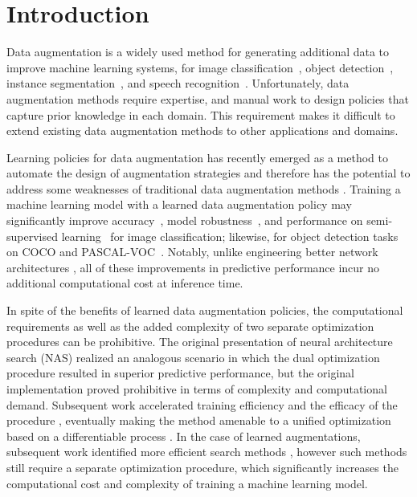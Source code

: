 

\section{Introduction}


Data augmentation is a widely used method for generating additional data to improve machine learning systems, for image classification~\cite{simard2003best,krizhevsky2012imagenet,devries2017dataset,zhang2017mixup}, object detection~\cite{girshick2018detectron}, instance segmentation~\cite{fang2019instaboost}, and speech recognition~\cite{kanda2013elastic, hannun2014deep, park2019specaugment}. Unfortunately, data augmentation methods require expertise, and manual work to design policies that capture prior knowledge in each domain. This requirement makes it difficult to extend existing data augmentation methods to other applications and domains.  

Learning policies for data augmentation 
has recently emerged as a method to automate the design of augmentation strategies and therefore has the potential to address some weaknesses of traditional data augmentation methods
\cite{cubuk2018autoaugment, zoph2019learning, ho2019population, lim2019fast}. Training a machine learning model with a learned data augmentation policy
may significantly improve accuracy~\cite{cubuk2018autoaugment}, model robustness~\cite{lopes2019improving, yin2019afourier, recht2018cifar}, and performance on semi-supervised learning~\cite{xie2019unsupervised} for image classification; likewise, for object detection tasks on COCO and PASCAL-VOC~\cite{zoph2019learning}. Notably, unlike engineering better network architectures  \cite{zoph2017learning}, all of these improvements in predictive performance incur no additional  computational cost at inference time.

In spite of the benefits of learned data augmentation policies, the computational requirements as well as the added complexity of two separate optimization procedures can be prohibitive.
The original presentation of neural architecture search (NAS) realized an analogous scenario in which the dual optimization procedure resulted in superior predictive performance, but the original implementation proved prohibitive in terms of complexity and computational demand.
Subsequent work accelerated training efficiency and the efficacy of the procedure \cite{liu2018darts,pham2018efficient,liu2017progressive,liu2017hierarchical}, eventually making the method amenable to a unified optimization based on a differentiable process \cite{liu2018darts}.
In the case of learned augmentations, subsequent work identified more efficient search methods \cite{ho2019population,lim2019fast}, however such methods still require a separate optimization procedure, which significantly increases the computational cost and complexity of training a machine learning model.

